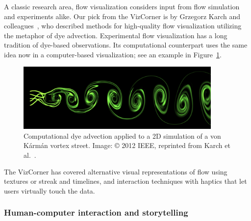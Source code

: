 \documentclass[10pt,journal,compsoc]{IEEEtran}
\begin{document}
A classic research area, flow visualization considers input from flow simulation and experiments alike. Our pick from the VizCorner is by Grzegorz Karch and colleagues~\cite{Karch2012}, who described methods for high-quality flow visualization utilizing the metaphor of dye advection. Experimental flow visualization has a long tradition of dye-based observations. Its computational counterpart uses the same idea now in a computer-based visualization; see an example in Figure~\ref{fig:karman}. 

\begin{figure}
	\begin{center}	
		\includegraphics[width=0.9\textwidth]{karman_weno3.png}
		\caption{Computational dye advection applied to a 2D simulation of a von K{\'a}rm{\'a}n vortex street. Image: \copyright{} 2012 IEEE, reprinted from Karch et al.~\cite{Karch2012}.
  \label{fig:karman}}		
	\end{center}
\end{figure}

The VizCorner has covered alternative visual representations of flow using textures or streak and timelines, 
and interaction techniques with haptics that let users virtually touch the data.

\subsubsection*{Human-computer interaction and storytelling}

\end{document}
